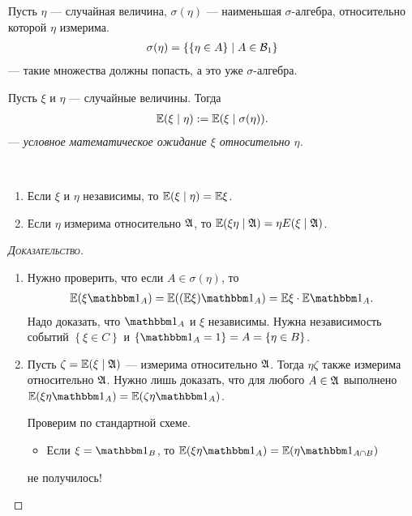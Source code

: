 \documentclass[../main.tex]{subfiles}
\begin{document}
\begin{df}
 Пусть $ \eta $ --- случайная величина, $ \sigma(\eta) $ --- наименьшая $ \sigma $-алгебра, относительно которой $ \eta $ измерима.
 \begin{align*}
  \sigma(\eta) = \left\{ \left\{ \eta \in A \right\} \mid A \in \mathcal B_1 \right\}
 \end{align*} --- такие множества должны попасть, а это уже $ \sigma $-алгебра.
\end{df}
\begin{df}
 Пусть $ \xi $ и $ \eta $ --- случайные величины. Тогда
 \begin{align*}
  \mathbb E(\xi \mid \eta) := \mathbb E (\xi \mid \sigma(\eta)).
 \end{align*} --- \textit{условное математическое ожидание $ \xi $ относительно $ \eta $.}
\end{df}
\begin{thm}\
 \begin{enumerate}
  \item Если $ \xi $ и $ \eta $ независимы, то $ \mathbb E(\xi \mid\eta)=\mathbb E\xi $.
  \item Если $ \eta $ измерима относительно $ \mathfrak A $, то $ \mathbb E(\xi\eta \mid\mathfrak A) = \eta E(\xi \mid \mathfrak A) $.
 \end{enumerate}
\end{thm}
\begin{proof}[\normalfont\textsc{Доказательство}]\
 \begin{enumerate}
  \item Нужно проверить, что если $ A \in \sigma(\eta) $, то
   \begin{align*}
    \E(\xi\Ind_A) = \E((\E\xi)\Ind_A) = \E\xi \cdot \E \Ind_A.
   \end{align*}
   Надо доказать, что $ \Ind_A  $ и $ \xi $ независимы. Нужна независимость событий $ \left\{ \xi \in C \right\} $ и $ \left\{ \Ind_A = 1 \right\} = A  = \left\{ \eta \in B \right\}$.

  \item Пусть $ \zeta = \mathbb E(\xi\mid\mathfrak A) $ --- измерима относительно $ \mathfrak A $. Тогда $ \eta\zeta $ также измерима относительно $ \mathfrak A $. Нужно лишь доказать, что для любого $ A \in \mathfrak A $ выполнено $ \E(\xi\eta\Ind_A) = \E(\zeta\eta\Ind_A) $.

   Проверим по стандартной схеме.
   \begin{itemize}
    \item Если $ \xi = \Ind_B $, то $ \E(\xi\eta\Ind_A) = \E(\eta\Ind_{A\cap B}) $
   \end{itemize}

   {\color{red} не получилось!}
   
 \end{enumerate}
\end{proof}
\end{document}
